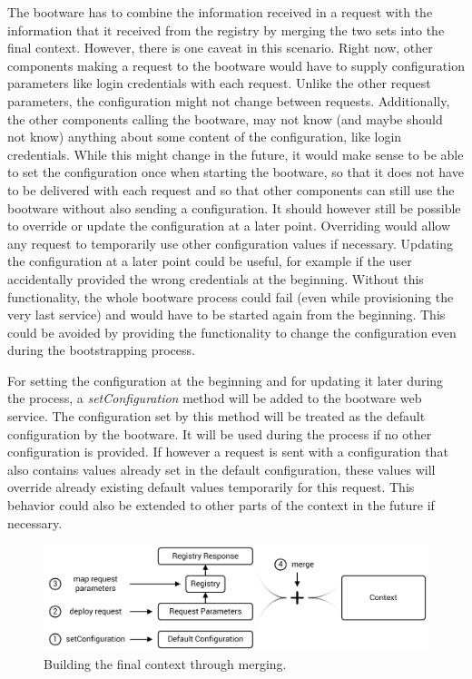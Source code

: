 The bootware has to combine the information received in a request with the information that it received from the registry by merging the two sets into the final context.
However, there is one caveat in this scenario.
Right now, other components making a request to the bootware would have to supply configuration parameters like login credentials with each request.
Unlike the other request parameters, the configuration might not change between requests.
Additionally, the other components calling the bootware, may not know (and maybe should not know) anything about some content of the configuration, like login credentials.
While this might change in the future, it would make sense to be able to set the configuration once when starting the bootware, so that it does not have to be delivered with each request and so that other components can still use the bootware without also sending a configuration.
It should however still be possible to override or update the configuration at a later point.
Overriding would allow any request to temporarily use other configuration values if necessary.
Updating the configuration at a later point could be useful, for example if the user accidentally provided the wrong credentials at the beginning.
Without this functionality, the whole bootware process could fail (even while provisioning the very last service) and would have to be started again from the beginning.
This could be avoided by providing the functionality to change the configuration even during the bootstrapping process.

For setting the configuration at the beginning and for updating it later during the process, a \textit{setConfiguration} method will be added to the bootware web service.
The configuration set by this method will be treated as the default configuration by the bootware.
It will be used during the process if no other configuration is provided.
If however a request is sent with a configuration that also contains values already set in the default configuration, these values will override already existing default values temporarily for this request.
This behavior could also be extended to other parts of the context in the future if necessary.

\begin{figure}[!htbp]
	\centering
	\includegraphics[resolution=600]{design/assets/merge}
	\caption{Building the final context through merging.}
	\label{image:merge}
\end{figure}

